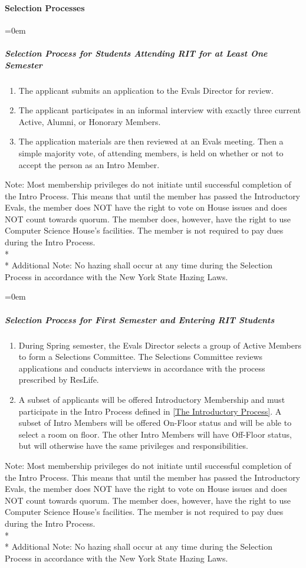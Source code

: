 \documentclass{article}
\newcommand{\asubsubsection}[1]{\paragraph{#1} \label{#1}}
\newcommand{\asubsubsubsection}[1]{\parindent=0em\subparagraph{#1} \label{#1}}
\begin{document}
\asubsubsection{Selection Processes}
\renewcommand{\theenumi}{\alph{enumi}} %

\asubsubsubsection{Selection Process for Students Attending RIT for at Least One Semester}
\begin{enumerate}
	\item The applicant submits an application to the Evals Director for review.
	\item The applicant participates in an informal interview with exactly three current Active, Alumni, or Honorary Members.
	\item The application materials are then reviewed at an Evals meeting.
	Then a simple majority vote, of attending members, is held on whether or not to accept the person as an Intro Member.
\end{enumerate}
Note: Most membership privileges do not initiate until successful completion of the Intro Process.
This means that until the member has passed the Introductory Evals, the member does NOT have the right to vote on House issues and does NOT count towards quorum.
The member does, however, have the right to use Computer Science House's facilities.
The member is not required to pay dues during the Intro Process.
\\* \\*
Additional Note: No hazing shall occur at any time during the Selection Process in accordance with the New York State Hazing Laws.

\asubsubsubsection{Selection Process for First Semester and Entering RIT Students}
\begin{enumerate}
	\item During Spring semester, the Evals Director selects a group of Active Members to form a Selections Committee.
		The Selections Committee reviews applications and conducts interviews in accordance with the process prescribed by ResLife.
        \item A subset of applicants will be offered Introductory Membership and must participate in the Intro Process defined in \ref{The Introductory Process}. 
            A subset of Intro Members will be offered On-Floor status and will be able to select a room on floor. 
            The other Intro Members will have Off-Floor status, but will otherwise have the same privileges and responsibilities.
\end{enumerate}
Note: Most membership privileges do not initiate until successful completion of the Intro Process.
This means that until the member has passed the Introductory Evals, the member does NOT have the right to vote on House issues and does NOT count towards quorum.
The member does, however, have the right to use Computer Science House's facilities.
The member is not required to pay dues during the Intro Process.
\\* \\*
Additional Note: No hazing shall occur at any time during the Selection Process in accordance with the New York State Hazing Laws.
\end{document}
